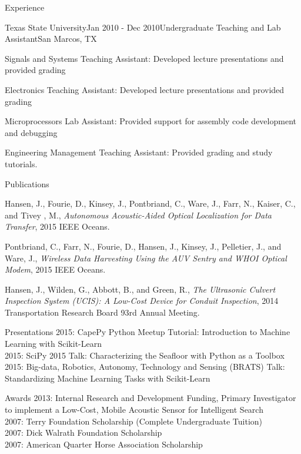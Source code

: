 \documentclass{resume} %
\begin{document}
\begin{rSection}{Experience}
\begin{rSubsection}{Texas State University}{Jan 2010 - Dec 2010}{Undergraduate Teaching and Lab Assistant}{San Marcos, TX}
\item{Signals and Systems Teaching Assistant: Developed lecture presentations and provided grading}
\item{Electronics Teaching Assistant: Developed lecture presentations and provided grading}
\item{Microprocessors Lab Assistant: Provided support for assembly code development and debugging}
\item{Engineering Management Teaching Assistant: Provided grading and study tutorials.}
\end{rSubsection}
\end{rSection}


\begin{rSection}{Publications}

Hansen, J., Fourie, D., Kinsey, J., Pontbriand, C., Ware, J., Farr, N., Kaiser, C., and Tivey
, M., \textit{Autonomous Acoustic-Aided Optical Localization for Data Transfer}, 2015 IEEE Oceans.

Pontbriand, C., Farr, N., Fourie, D., Hansen, J.,  Kinsey, J., Pelletier, J., and Ware, J., 
 \textit{Wireless Data Harvesting Using the AUV Sentry and WHOI Optical Modem}, 2015 IEEE Oceans.

Hansen, J., Wilden, G., Abbott, B., and Green, R., \textit{The Ultrasonic Culvert
Inspection System (UCIS): A Low-Cost Device for Conduit Inspection}, 2014 Transportation
Research Board 93rd Annual Meeting. 
\end{rSection}

\begin{rSection}{Presentations}
2015: CapePy Python Meetup Tutorial: Introduction to Machine Learning with Scikit-Learn \smallskip \\
2015: SciPy 2015 Talk: Characterizing the Seafloor with Python as a Toolbox \smallskip \\
2015: Big-data, Robotics, Autonomy, Technology and Sensing (BRATS) Talk: Standardizing Machine Learning Tasks with Scikit-Learn \\
\end{rSection}

\begin{rSection}{Awards}
{2013: Internal Research and Development Funding, Primary Investigator to implement a Low-Cost, Mobile Acoustic Sensor for Intelligent Search} \smallskip   \\
{2007: Terry Foundation Scholarship (Complete Undergraduate Tuition)}  \smallskip \\
{2007: Dick Walrath Foundation Scholarship} \smallskip \\
{2007: American Quarter Horse Association Scholarship} \smallskip \\
\end{rSection}
\end{document}
